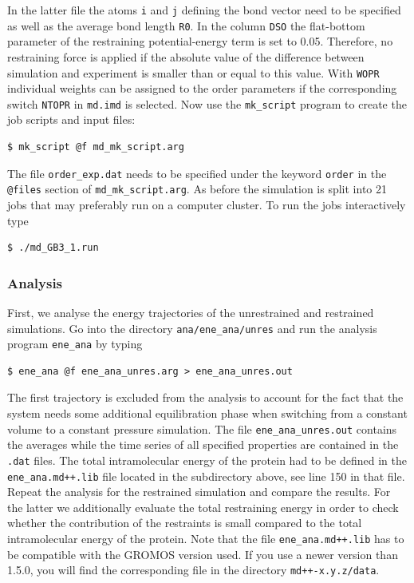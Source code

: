 In the latter file the atoms \texttt{i} and \texttt{j} defining the bond vector need to be specified as well as the average bond length \texttt{R0}. 
In the column \texttt{DSO} the flat-bottom parameter of the restraining potential-energy term is set to 0.05. Therefore, no restraining force is applied if the absolute value of the difference between simulation and experiment is smaller than or equal to this value.
With \texttt{WOPR} individual weights can be assigned to the order parameters if the corresponding switch \texttt{NTOPR} in \texttt{md.imd}
is selected. Now use the \texttt{mk\_script} program to create the job scripts and input files:
\begin{lstlisting}
$ mk_script @f md_mk_script.arg
\end{lstlisting}
The file \texttt{order\_exp.dat} needs to be specified under the keyword \texttt{order} in the \texttt{@files} section of \texttt{md\_mk\_script.arg}.
As before the simulation is split into 21 jobs that may preferably run on a computer cluster. To run the jobs interactively type
\begin{lstlisting}
$ ./md_GB3_1.run
\end{lstlisting}

\subsubsection{Analysis}
First, we analyse the energy trajectories of the unrestrained and restrained simulations. Go into the directory \texttt{ana/ene\_ana/unres} and run the analysis program \texttt{ene\_ana} by typing
\begin{lstlisting}
$ ene_ana @f ene_ana_unres.arg > ene_ana_unres.out
\end{lstlisting}
The first trajectory is excluded from the analysis to account for the fact that the system needs some additional equilibration phase when switching from a constant volume to a constant pressure simulation.
The file \texttt{ene\_ana\_unres.out} contains the averages while the time series of all specified properties are contained in the \texttt{.dat} files. The total intramolecular energy of the protein 
had to be defined in the \texttt{ene\_ana.md++.lib} file located in the subdirectory above, see line 150 in that file. Repeat the analysis for the restrained simulation and compare the results. For the latter we additionally 
evaluate the total restraining energy in order to check whether the contribution of the restraints is small compared to the total intramolecular energy of the protein. 
Note that the file \texttt{ene\_ana.md++.lib} has to be compatible with the GROMOS version used. If you use a newer version than 1.5.0, you will find the corresponding file in the directory \texttt{md++-x.y.z/data}.

